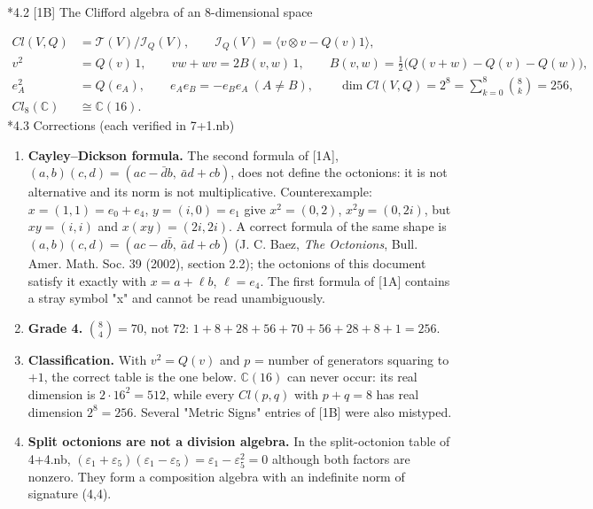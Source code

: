 \documentclass[10pt,a4paper]{article}
\makeatletter
\renewcommand\subsection{\@startsection{subsection}{2}{\z@}{-3.25ex\@plus -1ex \@minus -.2ex}{1.5ex \@plus .2ex}{\normalfont\large\bfseries\raggedright}}
\makeatother
\begin{document}
\subsection*{4.2 [1B] The Clifford algebra of an 8-dimensional space}
\begin{align*}
Cl(V,Q)&=\mathcal T(V)/\mathcal I_Q(V),\qquad \mathcal I_Q(V)=\big\langle v\otimes v-Q(v)1\big\rangle, \\
v^2&=Q(v)\,1,\qquad vw+wv=2B(v,w)\,1,\qquad B(v,w)=\tfrac12\big(Q(v+w)-Q(v)-Q(w)\big), \\
e_A^2&=Q(e_A),\qquad e_Ae_B=-e_Be_A\ (A\neq B),\qquad \dim Cl(V,Q)=2^8=\textstyle\sum_{k=0}^{8}\binom8k=256, \\
Cl_8(\mathbb C)&\cong\mathbb C(16).
\end{align*}
\subsection*{4.3 Corrections (each verified in 7+1.nb)}
\begin{enumerate}
\item \textbf{Cayley–Dickson formula.} The second formula of [1A], $(a,b)(c,d)=(ac-\bar d b,\ \bar a d+cb)$, does not define the octonions: it is not alternative and its norm is not multiplicative. Counterexample: $x=(1,1)=e_0+e_4$, $y=(i,0)=e_1$ give $x^2=(0,2)$, $x^2y=(0,2i)$, but $xy=(i,i)$ and $x(xy)=(2i,2i)$. A correct formula of the same shape is $(a,b)(c,d)=(ac-d\bar b,\ \bar a d+cb)$ (J. C. Baez, \emph{The Octonions}, Bull. Amer. Math. Soc. 39 (2002), section 2.2); the octonions of this document satisfy it exactly with $x=a+\ell b$, $\ell=e_4$. The first formula of [1A] contains a stray symbol "x" and cannot be read unambiguously.
\item \textbf{Grade 4.} $\binom84=70$, not 72: $1+8+28+56+70+56+28+8+1=256$.
\item \textbf{Classification.} With $v^2=Q(v)$ and $p$ = number of generators squaring to $+1$, the correct table is the one below. $\mathbb C(16)$ can never occur: its real dimension is $2\cdot16^2=512$, while every $Cl(p,q)$ with $p+q=8$ has real dimension $2^8=256$. Several "Metric Signs" entries of [1B] were also mistyped.
\item \textbf{Split octonions are not a division algebra.} In the split-octonion table of 4+4.nb, $(\varepsilon_1+\varepsilon_5)(\varepsilon_1-\varepsilon_5)=\varepsilon_1-\varepsilon_5^2=0$ although both factors are nonzero. They form a composition algebra with an indefinite norm of signature (4,4).
\end{enumerate}
\end{document}
